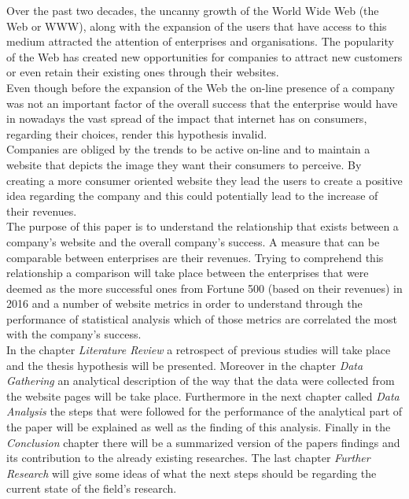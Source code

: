 \documentclass{article}
\begin{document}
Over the past two decades, the uncanny growth of the World Wide Web (the Web or WWW), along with the expansion of the users that have access to this medium attracted the attention of enterprises and organisations. The popularity of the Web has created new opportunities for companies to attract new customers or even retain their existing ones through their websites.\\ 
Even though before the expansion of the Web the on-line presence of a company was not an important factor of the overall success that the enterprise would have in nowadays the vast spread of the impact that internet has on consumers, regarding their choices, render this hypothesis invalid.\\
Companies are obliged by the trends to be active on-line and to maintain a website that depicts the image they want their consumers to perceive. By creating a more consumer oriented website they lead the users to create a positive idea regarding the company and this could potentially lead to the increase of their revenues.\\
The purpose of this paper is to understand the relationship that exists between a company's website and the overall company's success. A measure that can be comparable between enterprises are their revenues. Trying to comprehend this relationship a comparison will take place between the enterprises that were deemed as the more successful ones from Fortune 500 (based on their revenues) in 2016 and a number of website metrics in order to understand through the performance of statistical analysis which of those metrics are correlated the most with the company's success.\\
In the chapter \textit{Literature Review} a retrospect of previous studies will take place and the thesis hypothesis will be presented. Moreover in the chapter \textit{Data Gathering} an analytical description of the way that the data were collected from the website pages will be take place. Furthermore in the next chapter called \textit{Data Analysis} the steps that were followed for the performance of the analytical part of the paper will be explained as well as the finding of this analysis. Finally in the \textit{Conclusion} chapter there will be a summarized version of the papers findings and its contribution to the already existing researches. The last chapter \textit{Further Research} will give some ideas of what the next steps should be regarding the current state of the field's research.
\newpage
\end{document}
